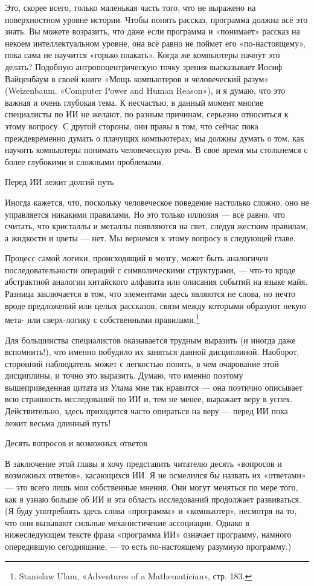 \documentclass[../main.tex]{subfiles}
\begin{document}
Это, скорее всего, только маленькая часть того, что не выражено на поверхностном уровне истории. Чтобы понять рассказ, программа должна всё это знать. Вы можете возразить, что даже если программа и «понимает» рассказ на некоем интеллектуальном уровне, она всё равно не поймет его «по-настоящему», пока сама не научится «горько плакать». Когда же компьютеры начнут это делать? Подобную антропоцентрическую точку зрения высказывает Иосиф Вайценбаум в своей книге «Мощь компьютеров и человеческий разум» (Weizenbaum. «Computer Power and Human Reason»), и я думаю, что это важная и очень глубокая тема. К несчастью, в данный момент многие специалисты по ИИ не желают, по разным причинам, серьезно относиться к этому вопросу. С другой стороны, они правы в том, что сейчас пока преждевременно думать о плачущих компьютерах; мы должны думать о том, как научить компьютеры понимать человеческую речь. В свое время мы столкнемся с более глубокими и сложными проблемами.

Перед ИИ лежит долгий путь

Иногда кажется, что, поскольку человеческое поведение настолько сложно, оно не управляется никакими правилами. Но это только иллюзия --- всё равно, что считать, что кристаллы и металлы появляются на свет, следуя жестким правилам, а жидкости и цветы --- нет. Мы вернемся к этому вопросу в следующей главе.

Процесс самой логики, происходящий в мозгу, может быть аналогичен последовательности операций с символическими структурами, --- что-то вроде абстрактной аналогии китайского алфавита или описания событий на языке майя. Разница заключается в том, что элементами здесь являются не слова, но нечто вроде предложений или целых рассказов, связи между которыми образуют некую мета- или сверх-логику с собственными правилами.\footnote{Stanislaw Ulam, «Adventures of a Mathematician», стр. 183.}

Для большинства специалистов оказывается трудным выразить (и иногда даже вспомнить!), что именно побудило их заняться данной дисциплиной. Наоборот, сторонний наблюдатель может с легкостью понять, в чем очарование этой дисциплины, и точно это выразить. Думаю, что именно поэтому вышеприведенная цитата из Улама мне так нравится --- она поэтично описывает всю странность исследований по ИИ и, тем не менее, выражает веру в успех. Действительно, здесь приходится часто опираться на веру --- перед ИИ пока лежит весьма длинный путь!

Десять вопросов и возможных ответов

В заключение этой главы я хочу представить читателю десять «вопросов и возможных ответов», касающихся ИИ\@. Я не осмелился бы назвать их «ответами» --- это всего лишь мои собственные мнения. Они могут меняться по мере того, как я узнаю больше об ИИ и эта область исследований продолжает развиваться. (Я буду употреблять здесь слова «программа» и «компьютер», несмотря на то, что они вызывают сильные механистичекие ассоциации. Однако в нижеследующем тексте фраза «программа ИИ» означает программу, намного опередившую сегодняшние, --- то есть по-настоящему разумную программу.)
\end{document}
